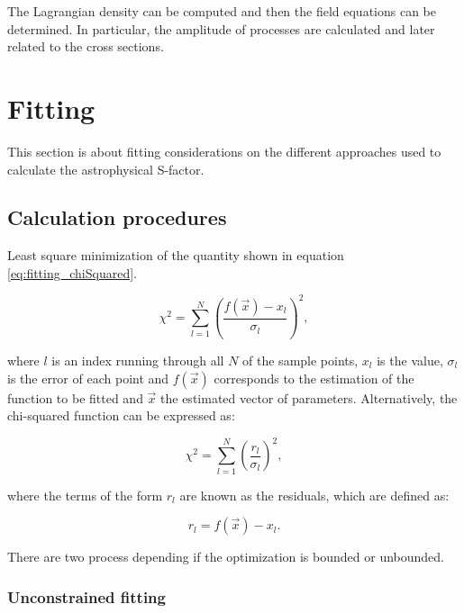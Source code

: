 \documentclass[openany]{book}
\begin{document}
The Lagrangian density can be computed and then the field equations can be determined. In particular, the amplitude of processes are calculated and later related to the cross sections. 

\chapter{Fitting} \label{ap:fitting}

This section is about fitting considerations on the different approaches used to calculate the astrophysical S-factor.

\section{Calculation procedures} \label{sec:calculationFitting}

Least square minimization of the quantity shown in equation \ref{eq:fitting_chiSquared}.

\begin{equation} \label{eq:fitting_chiSquared}
	\chi^2  = \sum_{l=1}^{N} {\left(\frac{f(\vec x) - x_l}{\sigma_l}\right)^2},
\end{equation}

where $l$ is an index running through all $N$ of the sample points, $x_l$ is the value, $\sigma_l$ is the error of each point and $f(\vec x)$ corresponds to the estimation of the function to be fitted and $\vec x$ the estimated vector of parameters. Alternatively, the chi-squared function can be expressed as: 

\begin{equation} \label{eq:fitting_chiSquared_residuals}
	\chi^2  = \sum_{l=1}^{N} {\left(\frac{r_l}{\sigma_l}\right)^2},
\end{equation}

where the terms of the form $r_l$ are known as the residuals, which are defined as:

\begin{equation} \label{eq:fitting_residuals}
	r_l = f(\vec x) - x_l.
\end{equation}

There are two process depending if the optimization is bounded or unbounded.

\subsection{Unconstrained fitting} \label{sub:unconstrainedFitting}
\end{document}
